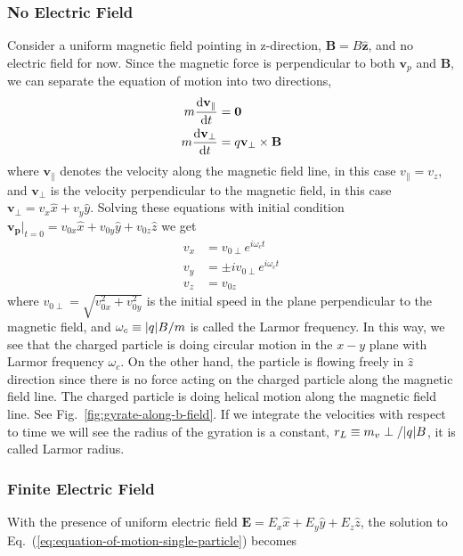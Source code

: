 \subsubsection*{No Electric Field}
Consider a uniform magnetic field pointing in z-direction, $\mathbf{B}=B\mathbf{\hat{z}}$, and no electric field for now. Since the magnetic force is perpendicular to both $\mathbf{v}_p$ and $\mathbf{B}$, we can separate the equation of motion into two directions,
\begin{equation}
	\begin{aligned}
		m\dv{\mathbf{v_\parallel}}{t} & = \mathbf{0}                 \\
		m\dv{\mathbf{v_\perp}}{t}     & = q\mathbf{v_\perp \times B}
	\end{aligned}
\end{equation}
where $\mathbf{v_\parallel}$ denotes the velocity along the magnetic field line, in this case $v_\parallel = v_z$, and $\mathbf{v_\perp}$ is the velocity perpendicular to the magnetic field, in this case $\mathbf{v_\perp} = v_x\hat{x} + v_y\hat{y}$. Solving these equations with initial condition $\mathbf{v_p}|_{t=0} = v_{0x}\hat{x} + v_{0y}\hat{y} + v_{0z}\hat{z}$  we get
\begin{equation}
	\begin{aligned}
		v_x & = v_{0\perp} e^{i\omega_c t}      \\
		v_y & = \pm iv_{0\perp} e^{i\omega_c t} \\
		v_z & = v_{0z}
	\end{aligned}
\end{equation}
where $v_{0\perp} = \sqrt{v_{0x}^2+v_{0y}^2}$ is the initial speed in the plane perpendicular to the magnetic field, and $\omega_c \equiv \abs{q}B/m$ is called the Larmor frequency. In this way, we see that the charged particle is doing circular motion in the $x-y$ plane with Larmor frequency $\omega_c$. On the other hand, the particle is flowing freely in $\hat{z}$ direction since there is no force acting on the charged particle along the magnetic field line. The charged particle is doing helical motion along the magnetic field line. See Fig.~\ref{fig:gyrate-along-b-field}. If we integrate the velocities with respect to time we will see the radius of the gyration is a constant, $r_L \equiv m_v\perp/\abs{q}B$, it is called Larmor radius.

\subsubsection*{Finite Electric Field}
With the presence of uniform electric field $\mathbf{E} = E_x\hat{x} + E_y\hat{y} + E_z\hat{z}$, the solution to Eq.~(\ref{eq:equation-of-motion-single-particle}) becomes

